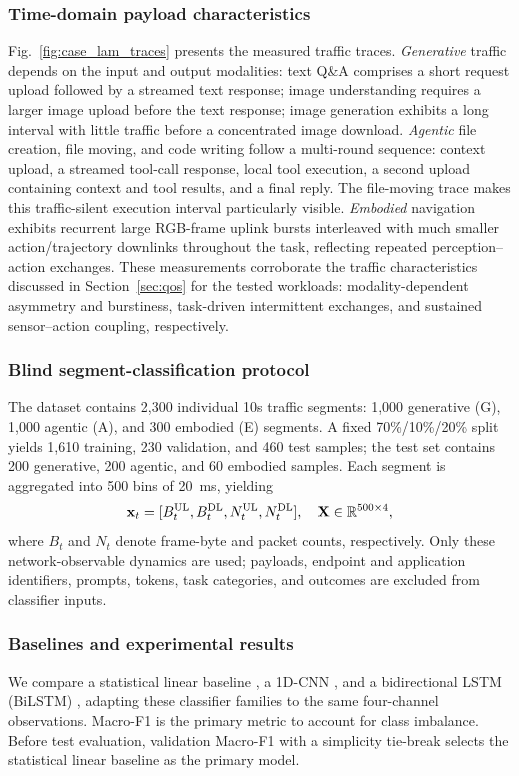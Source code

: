 \documentclass[letterpaper,journal]{IEEEtran}
\begin{document}
\subsubsection{Time-domain payload characteristics}
Fig.~\ref{fig:case_lam_traces} presents the measured traffic traces.
\emph{Generative} traffic depends on the input and output modalities: text
Q\&A comprises a short request upload followed by a streamed text response;
image understanding requires a larger image upload before the text response;
image generation exhibits a long interval with little traffic before a
concentrated image download. \emph{Agentic} file creation, file moving, and code
writing follow a multi-round sequence: context upload, a streamed tool-call
response, local tool execution, a second upload containing context and tool
results, and a final reply. The file-moving trace makes this
traffic-silent execution interval particularly visible. \emph{Embodied}
navigation exhibits recurrent large RGB-frame uplink bursts interleaved with
much smaller action/trajectory downlinks throughout the task, reflecting
repeated perception--action exchanges. These measurements corroborate the
traffic characteristics discussed in Section~\ref{sec:qos} for the tested
workloads: modality-dependent asymmetry and burstiness, task-driven
intermittent exchanges, and sustained sensor--action coupling, respectively.

\subsubsection{Blind segment-classification protocol}
The dataset contains 2,300 individual 10s traffic segments: 1,000 generative
(G), 1,000 agentic (A), and 300 embodied (E) segments. A fixed
70\%/10\%/20\% split yields 1,610 training, 230 validation, and 460 test samples;
the test set contains 200 generative, 200 agentic, and 60 embodied samples. Each segment is aggregated
into 500 bins of 20~ms, yielding
\begin{equation}
\mathbf{x}_t=[B_t^{\rm UL},B_t^{\rm DL},N_t^{\rm UL},N_t^{\rm DL}],
\quad \mathbf{X}\in\mathbb{R}^{500\times4},
\label{eq:segment_input}
\end{equation}
where $B_t$ and $N_t$ denote frame-byte and packet counts, respectively.
Only these network-observable dynamics are used; payloads, endpoint and
application identifiers, prompts, tokens, task categories, and outcomes are
excluded from classifier inputs.

\subsubsection{Baselines and experimental results}
We compare a statistical linear baseline \cite{esl}, a 1D-CNN
\cite{trafficcnn}, and a bidirectional LSTM (BiLSTM) \cite{bilstm}, adapting
these classifier families to the same four-channel observations. Macro-F1 is the primary
metric to account for class imbalance. Before test evaluation, validation
Macro-F1 with a simplicity tie-break selects the statistical linear baseline
as the primary model.
\end{document}
